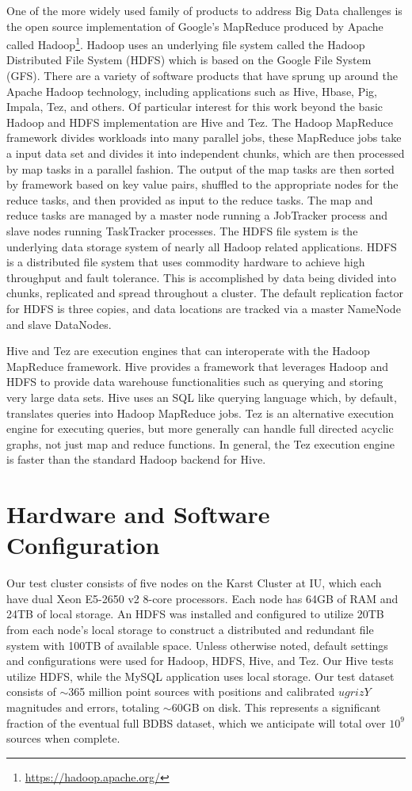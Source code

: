 \documentclass[11pt,twoside]{article}
\begin{document}
One of the more widely used family of products to address Big Data challenges is the open source
implementation of Google's MapReduce produced by Apache called
Hadoop\footnote{\url{https://hadoop.apache.org/}}. Hadoop uses an underlying file system called the Hadoop
Distributed File System (HDFS) which is based on the Google File System (GFS). There are a variety of software
products that have sprung up around the Apache Hadoop technology, including applications such as Hive, Hbase,
Pig, Impala, Tez, and others. Of particular interest for this work beyond the basic Hadoop and HDFS
implementation are Hive and Tez. The Hadoop MapReduce framework divides workloads into many parallel jobs, these MapReduce jobs take a input
data set and divides it into independent chunks, which are then processed by map tasks in a parallel
fashion. The output of the map tasks are then sorted by framework based on key value pairs, shuffled to the
appropriate nodes for the reduce tasks, and then provided as input to the reduce tasks. The map and reduce
tasks are managed by a master node running a JobTracker process and slave nodes running TaskTracker processes.
The HDFS file system is the underlying data storage system of nearly all Hadoop related applications. HDFS is
a distributed file system that uses commodity hardware to achieve high throughput and fault tolerance. This is
accomplished by data being divided into chunks, replicated and spread throughout a cluster. The
default replication factor for HDFS is three copies, and data locations are tracked via a master NameNode
and slave DataNodes.

Hive and Tez are execution engines that can interoperate with the Hadoop MapReduce framework. Hive provides a
framework that leverages Hadoop and HDFS to provide data warehouse functionalities such as querying and
storing very large data sets. Hive uses an SQL like querying language which, by default, translates queries
into Hadoop MapReduce jobs. Tez is an alternative execution engine for executing queries, but more generally
can handle full directed acyclic graphs, not just map and reduce functions. In general, the Tez execution
engine is faster than the standard Hadoop backend for Hive.

\section{Hardware and Software Configuration}
Our test cluster consists of five nodes on the Karst Cluster at IU, which each have dual Xeon E5-2650 v2
8-core processors. Each node has 64GB of RAM and 24TB of local storage. An HDFS was installed and configured
to utilize 20TB from each node's local storage to construct a distributed and redundant file system with 100TB
of available space. Unless otherwise noted, default settings and configurations were used for Hadoop, HDFS,
Hive, and Tez. Our Hive tests utilize HDFS, while the MySQL application uses local storage.  Our test dataset
consists of $\sim$365 million point sources with positions and calibrated $ugrizY$ magnitudes and errors,
totaling $\sim$60GB on disk.  This represents a significant fraction of the eventual full BDBS dataset, which
we anticipate will total over $10^9$ sources when complete.
\end{document}
